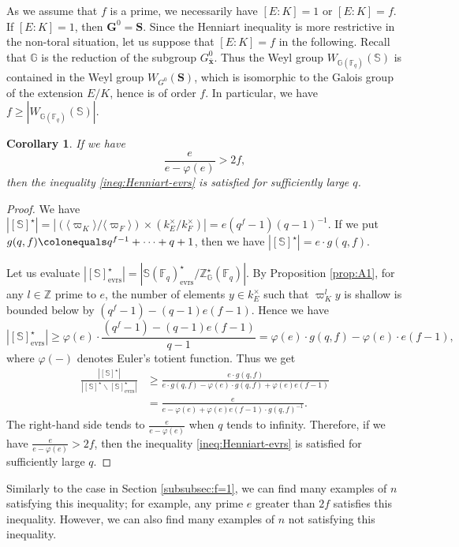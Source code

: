 \documentclass{amsart}
\newcommand{\evrs}{\mathrm{evrs}}
\newcommand{\x}{\mathbf{x}}
\newcommand{\Z}{\mathbb{Z}}
\newcommand{\F}{\mathbb{F}}
\newcommand{\bbS}{\mathbb{S}}
\newcommand{\bbG}{\mathbb{G}}
\newcommand{\bfG}{\mathbf{G}}
\newcommand{\bbZ}{\mathbb{Z}}
\newcommand{\bfS}{\mathbf{S}}
\theoremstyle{plain}
\newtheorem{cor}[thm]{Corollary}
\theoremstyle{definition}
\theoremstyle{remark}
\theoremstyle{theorem}
\begin{document}
As we assume that $f$ is a prime, we necessarily have $[E:K]=1$ or $[E:K]=f$.
If $[E:K]=1$, then $\bfG^{0}=\bfS$.
Since the Henniart inequality is more restrictive in the non-toral situation, let us suppose that $[E:K]=f$ in the following.
Recall that $\bbG$ is the reduction of the subgroup $G^{0}_{\bar{\x}}$.
Thus the Weyl group $W_{\bbG(\F_{q})}(\bbS)$ is contained in the Weyl group $W_{G^{0}}(\bfS)$, which is isomorphic to the Galois group of the extension $E/K$, hence is of order $f$.
In particular, we have $f\geq |W_{\bbG(\F_{q})}(\bbS)|$.

\begin{cor}\label{cor:A1}
If we have
\[
\frac{e}{e-\varphi(e)}>2f,
\]
then the inequality \eqref{ineq:Henniart-evrs} is satisfied for sufficiently large $q$.
\end{cor}

\begin{proof}
We have $|[\bbS]^{\star}|=|(\langle\varpi_{K}\rangle/\langle\varpi_{F}\rangle)\times(k_{E}^{\times}/k_{F}^{\times})|=e(q^{f}-1)(q-1)^{-1}$.
If we put $g(q,f)\colonequals q^{f-1}+\cdots+q+1$, then we have $|[\bbS]^{\star}|=e\cdot g(q,f)$.

Let us evaluate $|[\bbS]^{\star}_{\evrs}|=|\bbS(\F_{q})^{\star}_{\evrs}/\bbZ^{\star}_{\bbG}(\F_{q})|$.
By Proposition \ref{prop:A1}, for any $l\in\Z$ prime to $e$, the number of elements $y\in k_{E}^{\times}$ such that $\varpi_{K}^{l}y$ is shallow is bounded below by $(q^{f}-1)-(q-1)e(f-1)$.
Hence we have
\[
|[\bbS]^{\star}_{\evrs}|
\geq
\varphi(e)\cdot\frac{(q^{f}-1)-(q-1)e(f-1)}{q-1}
=\varphi(e)\cdot g(q,f)-\varphi(e)\cdot e(f-1),
\]
where $\varphi(-)$ denotes Euler's totient function.
Thus we get
\begin{align*}
\frac{|[\bbS]^{\star}|}{|[\bbS]^{\star}\smallsetminus [\bbS]^{\star}_{\evrs}|} 
&\geq
\frac{e\cdot g(q,f)}{e\cdot g(q,f)-\varphi(e)\cdot g(q,f)+\varphi(e)e(f-1)}\\
&=\frac{e}{e-\varphi(e)+\varphi(e)e(f-1)\cdot g(q,f)^{-1}}.
\end{align*}
The right-hand side tends to $\frac{e}{e-\varphi(e)}$ when $q$ tends to infinity.
Therefore, if we have $\frac{e}{e-\varphi(e)}>2f$, then the inequality \eqref{ineq:Henniart-evrs} is satisfied for sufficiently large $q$.
\end{proof}

Similarly to the case in Section \ref{subsubsec:f=1}, we can find many examples of $n$ satisfying this inequality; for example, any prime $e$ greater than $2f$ satisfies this inequality.
However, we can also find many examples of $n$ not satisfying this inequality.
\end{document}
